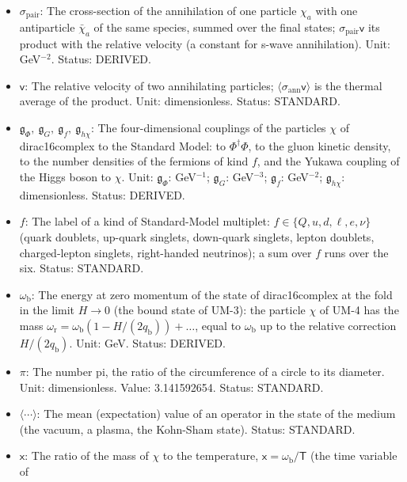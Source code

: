 \documentclass[
  10pt,
]{article}
\providecommand{\tightlist}{%
  \setlength{\itemsep}{0pt}\setlength{\parskip}{0pt}}
\begin{document}
\begin{itemize}
\tightlist
\item
  \(\sigma_{\mathrm{pair}}\): The cross-section of the annihilation of
  one particle \(\chi_a\) with one antiparticle \(\bar\chi_a\) of the
  same species, summed over the final states;
  \(\sigma_{\mathrm{pair}}\mathsf{v}\) its product with the relative
  velocity (a constant for s-wave annihilation). Unit: GeV\(^{-2}\).
  Status: DERIVED.
\item
  \(\mathsf{v}\): The relative velocity of two annihilating particles;
  \(\langle\sigma_{\mathrm{ann}}\mathsf{v}\rangle\) is the thermal
  average of the product. Unit: dimensionless. Status: STANDARD.
\item
  \(\mathfrak{g}_{\Phi},\ \mathfrak{g}_{G},\ \mathfrak{g}_{f},\ \mathfrak{g}_{h\chi}\):
  The four-dimensional couplings of the particles \(\chi\) of
  dirac16complex to the Standard Model: to \(\Phi^\dagger\Phi\), to the
  gluon kinetic density, to the number densities of the fermions of kind
  \(f\), and the Yukawa coupling of the Higgs boson to \(\chi\). Unit:
  \(\mathfrak{g}_{\Phi}\): GeV\(^{-1}\); \(\mathfrak{g}_{G}\):
  GeV\(^{-3}\); \(\mathfrak{g}_{f}\): GeV\(^{-2}\);
  \(\mathfrak{g}_{h\chi}\): dimensionless. Status: DERIVED.
\item
  \(f\): The label of a kind of Standard-Model multiplet:
  \(f \in \{Q, u, d, \ell, e, \nu\}\) (quark doublets, up-quark
  singlets, down-quark singlets, lepton doublets, charged-lepton
  singlets, right-handed neutrinos); a sum over \(f\) runs over the six.
  Status: STANDARD.
\item
  \(\omega_{\mathrm{b}}\): The energy at zero momentum of the state of
  dirac16complex at the fold in the limit \(H \to 0\) (the bound state
  of UM-3): the particle \(\chi\) of UM-4 has the mass
  \(\omega_{\mathrm{r}} = \omega_{\mathrm{b}}(1 - H/(2q_{\mathrm{b}})) + \dots\),
  equal to \(\omega_{\mathrm{b}}\) up to the relative correction
  \(H/(2q_{\mathrm{b}})\). Unit: GeV. Status: DERIVED.
\item
  \(\pi\): The number pi, the ratio of the circumference of a circle to
  its diameter. Unit: dimensionless. Value: 3.141592654. Status:
  STANDARD.
\item
  \(\langle\cdots\rangle\): The mean (expectation) value of an operator
  in the state of the medium (the vacuum, a plasma, the Kohn-Sham
  state). Status: STANDARD.
\item
  \(\mathsf{x}\): The ratio of the mass of \(\chi\) to the temperature,
  \(\mathsf{x} = \omega_{\mathrm{b}}/\mathsf{T}\) (the time variable of

\end{itemize}
\end{document}
